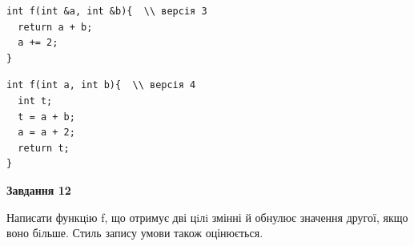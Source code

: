 \documentclass[12pt, ukrainian]{article}
\begin{document}
{\begin {large}
\begin{minipage}[t]{11.0cm}
\vspace{-8mm}\begin{verbatim}
int f(int &a, int &b){  \\ версія 3
  return a + b;
  a += 2;
}
\end{verbatim}

\vspace{-8mm}\begin{verbatim}
int f(int a, int b){  \\ версія 4
  int t;
  t = a + b;
  a = a + 2;
  return t;
}
\end{verbatim}



\begin{center}
\textbf{Завдання 12}
\end{center}

Написати функцiю f, що отримує дві цiлi змінні й обнулює значення другої, якщо воно бiльше. Стиль запису умови також оцінюється.\par

\end{minipage}

\end {large}}
\newpage
\end{document}
